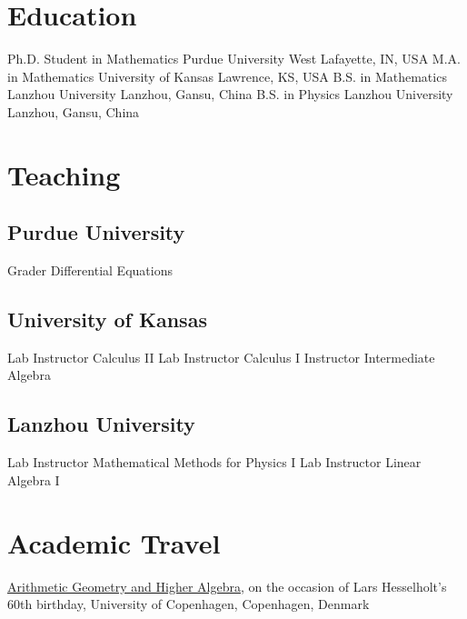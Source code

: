 \documentclass[11pt,letterpaper,sans]{moderncv}
\begin{document}
\makecvtitle

\section{Education}
  {Ph.D. Student in Mathematics}
  {Purdue University}
  {West Lafayette, IN, USA}
  {}{}
  {M.A. in Mathematics}
  {University of Kansas}
  {Lawrence, KS, USA}
  {}{}
  {B.S. in Mathematics}
  {Lanzhou University}
  {Lanzhou, Gansu, China}
  {}{}
  {B.S. in Physics}
  {Lanzhou University}
  {Lanzhou, Gansu, China}
  {}{}

\section{Teaching}
\subsection{Purdue University}
  {Grader}
  {Differential Equations}
  {}{}{}

\subsection{University of Kansas}
  {Lab Instructor}
  {Calculus II}{}{}{}
  {Lab Instructor}
  {Calculus I}{}{}{}
  {Instructor}
  {Intermediate Algebra}{}{}{}

\subsection{Lanzhou University}
  {Lab Instructor}
  {Mathematical Methods for Physics I}{}{}{}
  {Lab Instructor}
  {Linear Algebra I}{}{}{}

\section{Academic Travel}
\cvitem{\textcolor{color1}{Upcoming}}{}
  {\href{https://www.math.ku.dk/english/calendar/events/arithmetic-geometry-and-higher-algebra/}{Arithmetic Geometry and Higher Algebra}, on the occasion of Lars Hesselholt's 60th birthday, University of Copenhagen, Copenhagen, Denmark}
\end{document}
